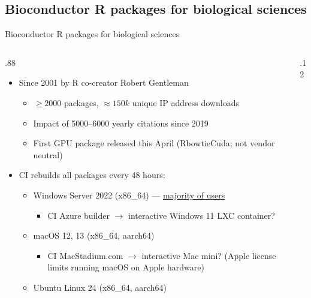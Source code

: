\documentclass[
aspectratio=169,
xcolor={usenames}
]{beamer}
\begin{document}
\subsection{Bioconductor R packages for biological sciences}
\begin{frame}{Bioconductor R packages for biological sciences}
  \begin{columns}[T]
    \begin{column}{.88\framewidth}
      \begin{itemize}[<+->]
      \item Since 2001 by R co-creator Robert Gentleman
        \begin{itemize}[<.->]
        \item $\ge 2000$ packages, %
          $\approx 150k$ unique IP address downloads\footnotemark[1]
        \item Impact of 5000--6000 yearly citations since 2019\footnotemark[1]
        \item First GPU package released this April %
          (RbowtieCuda; not vendor neutral)
        \end{itemize}
      \item CI rebuilds all packages every 48 hours:
        \begin{itemize}[<.->]
        \item Windows Server 2022 (x86\_64) --- \ul{majority of users}
          \begin{itemize}[<3->]
          \item CI Azure builder $\to$ %
            interactive Windows 11 LXC container?
          \end{itemize}
        \item macOS 12, 13 (x86\_64, aarch64)
          \begin{itemize}[<4->]
          \item CI MacStadium.com $\to$ interactive Mac mini? %
            (Apple license limits running macOS on Apple hardware)
          \end{itemize}
        \item Ubuntu Linux 24 (x86\_64, aarch64)
        \end{itemize}
      \end{itemize}
    \end{column}
    \begin{column}{.12\framewidth}
\end{column}
\end{columns}
\end{frame}
\end{document}
